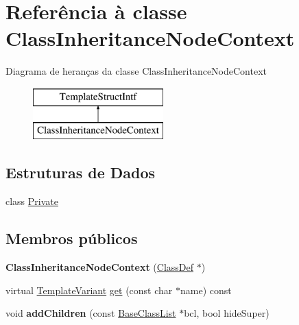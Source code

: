 \hypertarget{class_class_inheritance_node_context}{\section{Referência à classe Class\-Inheritance\-Node\-Context}
\label{class_class_inheritance_node_context}
}
Diagrama de heranças da classe Class\-Inheritance\-Node\-Context\begin{figure}[H]
\begin{center}
\leavevmode
\includegraphics[height=2.000000cm]{class_class_inheritance_node_context}
\end{center}
\end{figure}
\subsection*{Estruturas de Dados}
\begin{DoxyCompactItemize}
\item 
class \hyperlink{class_class_inheritance_node_context_1_1_private}{Private}
\end{DoxyCompactItemize}
\subsection*{Membros públicos}
\begin{DoxyCompactItemize}
\item 
\hypertarget{class_class_inheritance_node_context_aff053885f98b266781de0cfba45f618c}{{\bfseries Class\-Inheritance\-Node\-Context} (\hyperlink{class_class_def}{Class\-Def} $\ast$)}\label{class_class_inheritance_node_context_aff053885f98b266781de0cfba45f618c}

\item 
virtual \hyperlink{class_template_variant}{Template\-Variant} \hyperlink{class_class_inheritance_node_context_a1bcfea01201f3ea09981a8442842c42d}{get} (const char $\ast$name) const 
\item 
\hypertarget{class_class_inheritance_node_context_ab0dba386b4767dd0290754724d47af42}{void {\bfseries add\-Children} (const \hyperlink{class_base_class_list}{Base\-Class\-List} $\ast$bcl, bool hide\-Super)}\label{class_class_inheritance_node_context_ab0dba386b4767dd0290754724d47af42}

\end{DoxyCompactItemize}


